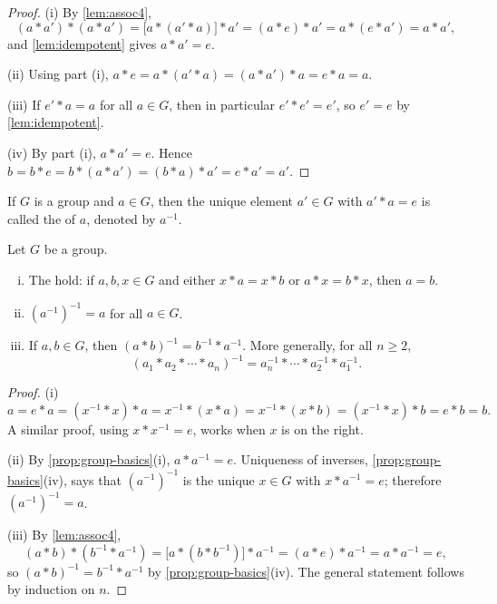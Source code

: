 \begin{proof}
	(i) By \autoref{lem:assoc4},
	\[
		(a*a')*(a*a') = \bigl[a*(a'*a)\bigr]*a' = (a*e)*a' = a*(e*a') = a*a',
	\]
	and \autoref{lem:idempotent} gives \(a*a' = e\).

	(ii) Using part (i),
	\(a*e = a*(a'*a) = (a*a')*a = e*a = a\).

	(iii) If \(e'*a = a\) for all \(a \in G\), then in particular \(e'*e' = e'\), so
	\(e' = e\) by \autoref{lem:idempotent}.

	(iv) By part (i), \(a*a' = e\). Hence
	\(b = b*e = b*(a*a') = (b*a)*a' = e*a' = a'\).
\end{proof}

\begin{definition}[Inverse]
	If \(G\) is a group and \(a \in G\), then the unique element \(a' \in G\) with
	\(a'*a = e\) is called the  of \(a\), denoted by \(a^{-1}\).
\end{definition}

\begin{lemma}\label{lem:group-cancellation}
	Let \(G\) be a group.
	\begin{enumerate}[(i)]
		\item The  hold: if \(a,b,x \in G\) and either
		      \(x*a = x*b\) or \(a*x = b*x\), then \(a = b\).
		\item \((a^{-1})^{-1} = a\) for all \(a \in G\).
		\item If \(a, b \in G\), then \((a*b)^{-1} = b^{-1}*a^{-1}\). More generally, for
		      all \(n \geq 2\),
		      \[
			      (a_1 * a_2 * \cdots * a_n)^{-1} = a_n^{-1} * \cdots * a_2^{-1} * a_1^{-1}.
		      \]
	\end{enumerate}
\end{lemma}

\begin{proof}
	(i)
	\[
		a = e*a = (x^{-1}*x)*a = x^{-1}*(x*a) = x^{-1}*(x*b) = (x^{-1}*x)*b = e*b = b.
	\]
	A similar proof, using \(x*x^{-1} = e\), works when \(x\) is on the right.

	(ii) By \autoref{prop:group-basics}(i), \(a*a^{-1} = e\). Uniqueness of
	inverses, \autoref{prop:group-basics}(iv), says that \((a^{-1})^{-1}\) is the
	unique \(x \in G\) with \(x*a^{-1} = e\); therefore \((a^{-1})^{-1} = a\).

	(iii) By \autoref{lem:assoc4},
	\[
		(a*b)*(b^{-1}*a^{-1}) = \bigl[a*(b*b^{-1})\bigr]*a^{-1} = (a*e)*a^{-1} = a*a^{-1} = e,
	\]
	so \((a*b)^{-1} = b^{-1}*a^{-1}\) by \autoref{prop:group-basics}(iv). The
	general statement follows by induction on \(n\).
\end{proof}

